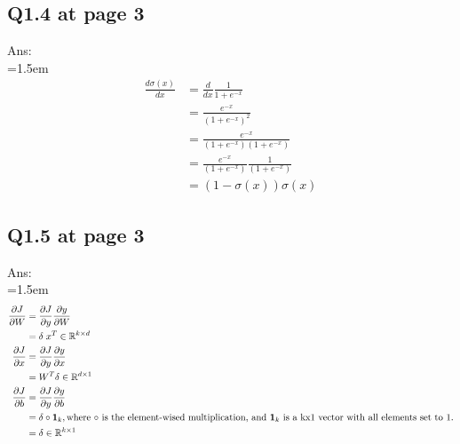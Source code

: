 \documentclass{article}
\begin{document}
	\newpage
	\subsection*{Q1.4 at page 3}
	Ans:\\
	\hangindent=1.5em \hspace{1.5em}
	\begin{align}
		\frac{d \sigma(x)}{dx} &= \frac{d}{dx} \frac{1}{1 + e^{-x}} \\
		&= \frac{e^{-x}}{(1+e^{-x})^2} \\
		&= \frac{e^{-x}}{(1+e^{-x})(1+e^{-x})} \\
		&= \frac{e^{-x}}{(1+e^{-x})} \frac{1}{(1+e^{-x})}\\
		&= (1-\sigma(x))\sigma(x)
	\end{align}		
	
	\newpage
	\subsection*{Q1.5 at page 3}
	Ans:\\
	\hangindent=1.5em \hspace{1.5em}
	\begin{align}
		\frac{\partial J}{\partial W} &= \frac{\partial J}{\partial y} \frac{\partial y}{\partial W}\\
		&= \delta \hspace{1mm} x^T \in \mathbb{R}^{k \times d} \\
		\frac{\partial J}{\partial x} &= \frac{\partial J}{\partial y} \frac{\partial y}{\partial x}\\
		&= W^T \delta \in \mathbb{R}^{d \times 1}\\
		\frac{\partial J}{\partial b} &= \frac{\partial J}{\partial y} \frac{\partial y}{\partial b}\\
		&= \delta \circ \mathbf{1}_k, \text{where $\circ$ is the element-wised multiplication, and $\mathbf{1}_k$ is a kx1 vector with all elements set to 1.} \\
		&= \delta \in \mathbb{R}^{k \times 1}
	\end{align}
	
	\newpage
\end{document}
